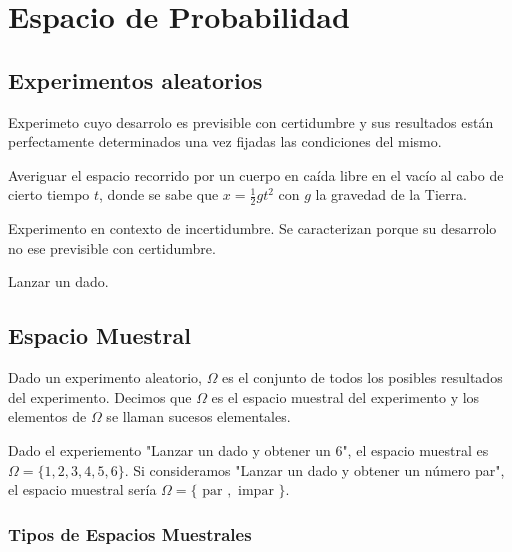 \chapter{Espacio de Probabilidad}
\section{Experimentos aleatorios}

\begin{defn}
  Experimeto cuyo desarrolo es previsible con certidumbre y sus resultados están perfectamente determinados una vez fijadas las condiciones del mismo.
\end{defn}

\begin{ejm}
  Averiguar el espacio recorrido por un cuerpo en caída libre en el vacío al cabo de cierto tiempo $t$, donde se sabe que $x = \frac{1}{2}g t^2$ con $g$ la gravedad de la Tierra.
\end{ejm}

\begin{defn}
  Experimento en contexto de incertidumbre. Se caracterizan porque su desarrolo no ese previsible con certidumbre.
\end{defn}

\begin{ejm}
  Lanzar un dado.
\end{ejm}

\section{Espacio Muestral}

\begin{defn}
  Dado un experimento aleatorio, $\Omega$ es el conjunto de todos los posibles resultados del experimento. Decimos que $\Omega$ es el espacio muestral del experimento y los elementos de $\Omega$ se llaman sucesos elementales.
\end{defn}

\begin{ejm}
  Dado el experiemento "Lanzar un dado y obtener un $6$", el espacio muestral es $\Omega = \{ 1, 2, 3, 4, 5, 6 \}$. Si consideramos "Lanzar un dado y obtener un número par", el espacio muestral sería $\Omega = \{ \text{ par }, \text{ impar } \}$.
\end{ejm}

\subsection{Tipos de Espacios Muestrales}

